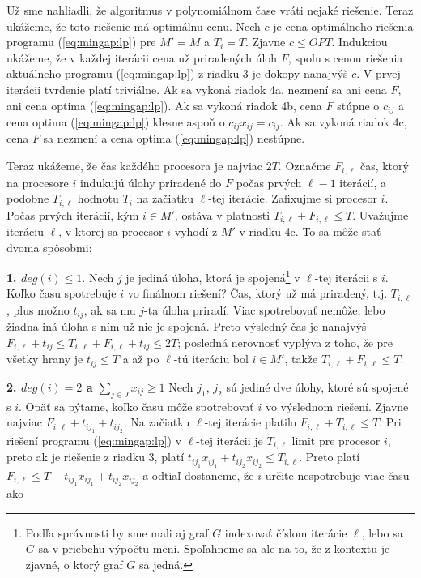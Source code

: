 \begin{dokaz}
  Už sme nahliadli, že algoritmus v polynomiálnom čase vráti nejaké riešenie. Teraz ukážeme, že toto riešenie
  má optimálnu cenu. Nech $c$ je cena optimálneho riešenia programu (\ref{eq:mingap:lp}) pre $M'=M$ a
  $T_i=T$. Zjavne $c\le OPT$.   
  Indukciou ukážeme, že v každej iterácii cena už priradených úloh $F$, spolu s 
  cenou riešenia aktuálneho programu (\ref{eq:mingap:lp}) z riadku 3 je dokopy nanajvýš $c$.
  V prvej iterácii tvrdenie platí triviálne. Ak sa vykoná riadok 4a, nezmení sa ani cena $F$, ani cena
  optima (\ref{eq:mingap:lp}). Ak sa vykoná riadok 4b, cena $F$ stúpne o $c_{ij}$ a cena optima 
  (\ref{eq:mingap:lp}) klesne aspoň
  o $c_{ij}x_{ij}=c_{ij}$. Ak sa vykoná riadok 4c, cena $F$ sa nezmení a cena optima
  (\ref{eq:mingap:lp}) nestúpne.


  \noindent
  Teraz ukážeme, že čas každého procesora je najviac $2T$.
  Označme $F_{i,\ell}$ čas, ktorý na procesore $i$ indukujú úlohy priradené do $F$ počas prvých
  $\ell-1$ iterácií, a podobne $T_{i,\ell}$ hodnotu $T_i$ na začiatku $\ell$-tej iterácie.
  Zafixujme si procesor $i$. Počas prvých iterácií, kým $i\in M'$, ostáva v platnosti
  $T_{i,\ell}+F_{i,\ell}\le T$. Uvažujme iteráciu $\ell$, v ktorej sa procesor $i$ vyhodí z $M'$ v riadku 4c.
  To sa môže stať dvoma spôsobmi:

  \noindent
  {\bfseries 1. $deg(i)\le1$}. Nech $j$ je jediná úloha, ktorá je spojená\footnote{Podľa správnosti by sme
    mali aj graf $G$ indexovať číslom iterácie $\ell$, lebo sa $G$ sa v priebehu výpočtu mení. Spoľahneme sa
  ale na to, že z kontextu je zjavné, o ktorý graf $G$ sa jedná.} v $\ell$-tej iterácii
  s $i$.
  Koľko času spotrebuje $i$ vo finálnom riešení? Čas, ktorý už má priradený, t.j. $T_{i,\ell}$, plus možno
  $t_{ij}$, ak sa mu $j$-ta úloha priradí. Viac spotrebovať nemôže, lebo žiadna iná úloha s ním už nie je spojená.
  Preto výsledný čas je nanajvýš $F_{i,\ell}+t_{ij}\le T_{i,\ell}+F_{i,\ell}+t_{ij}\le 2T$; posledná nerovnosť
  vyplýva z toho, že pre všetky hrany je $t_{ij}\le T$ a až po $\ell$-tú iteráciu bol $i\in M'$, takže
  $T_{i,\ell}+F_{i,\ell}\le T$.

  \noindent
  {\bfseries 2. $deg(i)=2$ a $\sum_{j\in J}x_{ij}\ge1$} Nech $j_1$, $j_2$ sú jediné dve úlohy, ktoré
  sú spojené s $i$. Opäť sa pýtame, koľko času môže spotrebovať $i$ vo výslednom riešení. Zjavne
  najviac $F_{i,\ell}+t_{ij_1}+t_{ij_2}$. Na začiatku $\ell$-tej iterácie platilo 
  $F_{i,\ell}+T_{i,\ell}\le T$. Pri riešení programu (\ref{eq:mingap:lp}) v $\ell$-tej iterácii
  je $T_{i,\ell}$ limit pre procesor $i$, preto ak  je riešenie z riadku 3, platí
  $t_{ij_1}x_{ij_1}+t_{ij_2}x_{ij_2}\le T_{i,\ell}$.
  Preto platí $F_{i,\ell}\le T-t_{ij_1}x_{ij_1}+t_{ij_2}x_{ij_2}$ a odtiaľ dostaneme,
  že $i$ určite nespotrebuje viac času ako 
  

\end{dokaz}
